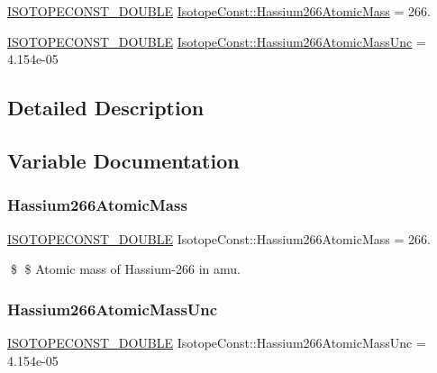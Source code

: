 \begin{DoxyCompactItemize}
\item 
\mbox{\hyperlink{group___isotope_const-_macros_ga8f45a7272ce02c0b4c65c44636ed719a}{I\+S\+O\+T\+O\+P\+E\+C\+O\+N\+S\+T\+\_\+\+D\+O\+U\+B\+LE}} \mbox{\hyperlink{group___isotope_const-_hassium-_hs266_ga2ac764eb2f6e3deeba1cacf46b08ab54}{Isotope\+Const\+::\+Hassium266\+Atomic\+Mass}} = 266.
\item 
\mbox{\hyperlink{group___isotope_const-_macros_ga8f45a7272ce02c0b4c65c44636ed719a}{I\+S\+O\+T\+O\+P\+E\+C\+O\+N\+S\+T\+\_\+\+D\+O\+U\+B\+LE}} \mbox{\hyperlink{group___isotope_const-_hassium-_hs266_ga1c9797b38d01abd04f735927fca3fb96}{Isotope\+Const\+::\+Hassium266\+Atomic\+Mass\+Unc}} = 4.\+154e-\/05
\end{DoxyCompactItemize}


\subsection{Detailed Description}


\subsection{Variable Documentation}
\mbox{\label{group___isotope_const-_hassium-_hs266_ga2ac764eb2f6e3deeba1cacf46b08ab54}} 
\subsubsection{\texorpdfstring{Hassium266\+Atomic\+Mass}{Hassium266AtomicMass}}
{\footnotesize\ttfamily \mbox{\hyperlink{group___isotope_const-_macros_ga8f45a7272ce02c0b4c65c44636ed719a}{I\+S\+O\+T\+O\+P\+E\+C\+O\+N\+S\+T\+\_\+\+D\+O\+U\+B\+LE}} Isotope\+Const\+::\+Hassium266\+Atomic\+Mass = 266.}

\$ \$ Atomic mass of Hassium-\/266 in amu. \mbox{\label{group___isotope_const-_hassium-_hs266_ga1c9797b38d01abd04f735927fca3fb96}} 
\subsubsection{\texorpdfstring{Hassium266\+Atomic\+Mass\+Unc}{Hassium266AtomicMassUnc}}
{\footnotesize\ttfamily \mbox{\hyperlink{group___isotope_const-_macros_ga8f45a7272ce02c0b4c65c44636ed719a}{I\+S\+O\+T\+O\+P\+E\+C\+O\+N\+S\+T\+\_\+\+D\+O\+U\+B\+LE}} Isotope\+Const\+::\+Hassium266\+Atomic\+Mass\+Unc = 4.\+154e-\/05}


